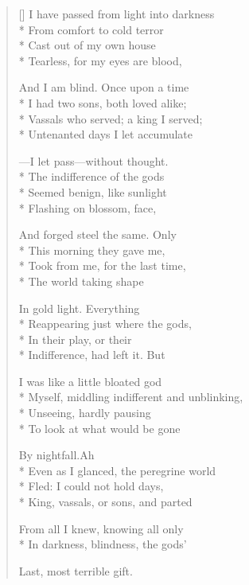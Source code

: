 \label{ch:lear_ax}
\settowidth{\versewidth}{Myself, middling indifferent and unblinking,}
\begin{verse}[\versewidth]
 I have passed from light into darkness\\*
From comfort to cold terror\\*
Cast out of my own house\\*
Tearless, for my eyes are blood,

And I am blind.  Once upon a time\\*
I had two sons, both loved alike;\\*
Vassals who served; a king I served;\\*
Untenanted days I let accumulate

---I let pass---without thought.\\*
The indifference of the gods\\*
Seemed benign, like sunlight\\*
Flashing on blossom, face,

And forged steel the same.  Only\\*
This morning they gave me,\\*
Took from me, for the last time,\\*
The world taking shape

In gold light.  Everything\\*
Reappearing just where the gods,\\*
In their play, or their\\*
Indifference, had left it.  But

I was like a little bloated god\\*
Myself, middling indifferent and unblinking,\\*
Unseeing, hardly pausing\\*
To look at what would be gone

By nightfall.\qquad Ah\\*
Even as I glanced, the peregrine world\\*
Fled: I could not hold days,\\*
King, vassals, or sons, and parted

From all I knew, knowing all only\\*
In darkness, blindness, the gods'

Last, most terrible gift.
\end{verse}
